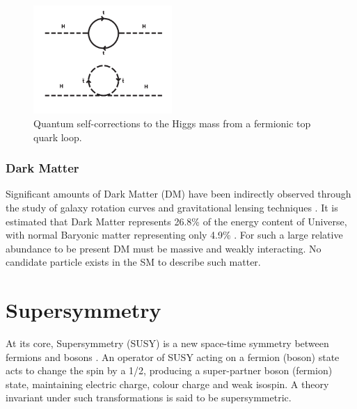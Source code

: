 \begin{figure}[t]
\centering
\includegraphics[width=0.47\textwidth,trim=0 250 0 0, clip=true]
{Figs/feynman/600px-Hqmc-vector.png}
\caption{Quantum self-corrections to the Higgs mass from a fermionic top quark
loop.}
\label{fig:quantum_higgs_fermion_loop}
\end{figure}

\subsubsection{Dark Matter}
Significant amounts of Dark Matter (DM) have been indirectly observed
through the study of galaxy rotation curves and
gravitational lensing techniques \cite{Bertone:2004pz}. It is 
estimated that Dark Matter represents 26.8\% of the energy content of Universe,
with normal Baryonic matter representing only 4.9\% \cite{Clowe:2006eq}. For
such a large relative abundance to be present DM must be massive and weakly
interacting. No candidate particle exists in the SM to describe such
matter.

\section{Supersymmetry}  %
\label{sec:theory_overview}
At its core, Supersymmetry (SUSY) is a new space-time symmetry
between fermions and bosons \cite{ref:SUSY-1,ref:SUSY0,ref:SUSY1,ref:SUSY2,ref:SUSY3,ref:SUSY4}.
An operator of SUSY acting on a fermion
(boson) state acts to change the spin by a 1/2, producing a super-partner
boson (fermion) state, maintaining electric charge, colour charge and weak
isospin. A theory invariant under such transformations is said to be
supersymmetric.

